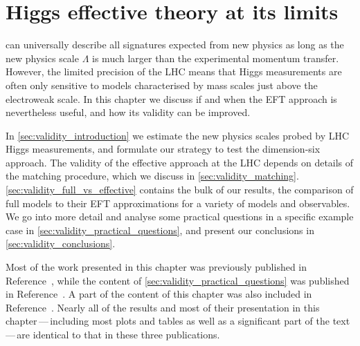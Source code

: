 



\chapter{Higgs effective theory at its limits}
\label{chapter:validity}


 can universally
describe all signatures expected from new physics as long as the new
physics scale $\Lambda$ is much larger than the experimental momentum
transfer. However, the limited precision of the LHC means that Higgs
measurements are often only sensitive to models characterised by mass
scales just above the electroweak scale. In this chapter we discuss if
and when the EFT approach is nevertheless useful, and how its validity
can be improved.

In \autoref{sec:validity_introduction} we estimate the new physics
scales probed by LHC Higgs measurements, and formulate our strategy to
test the dimension-six approach. The validity of the effective
approach at the LHC depends on details of the matching procedure,
which we discuss in
\autoref{sec:validity_matching}. \autoref{sec:validity_full_vs_effective}
contains the bulk of our results, the comparison of full models to
their EFT approximations for a variety of models and observables. We
go into more detail and analyse some practical questions in a specific
example case in \autoref{sec:validity_practical_questions}, and
present our conclusions in \autoref{sec:validity_conclusions}.

Most of the work presented in this chapter was previously published in
Reference~\cite{Brehmer:2015rna}, while the content of
\autoref{sec:validity_practical_questions} was published in
Reference~\cite{Biekotter:2016ecg}. A part of the content of this
chapter was also included in
Reference~\cite{deFlorian:2016spz}. Nearly all of the results and most
of their presentation in this chapter\,---\,including most plots and
tables as well as a significant part of the text\,---\,are identical
to that in these three publications.



